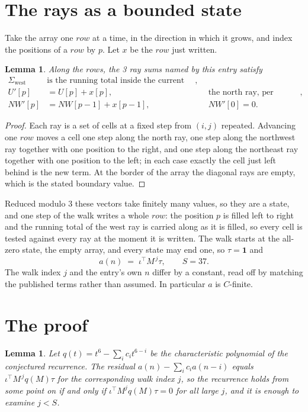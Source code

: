 \documentclass[11pt,a4paper]{article}
\theoremstyle{plain}
\newtheorem{lemma}[theorem]{Lemma}
\theoremstyle{definition}
\begin{document}
\section{The rays as a bounded state}

Take the array one $row$ at a time, in the direction in which it grows, and index the
positions of a $row $ by $p$. Let $x$ be the $row$ just written.

\begin{lemma}\label{lem:rays}
Along the $row$s, the 3 ray sums named by this entry satisfy
\[
\begin{aligned}
\Sigma_{\mathrm{west}}\ &\text{is the running total inside the current row},\\
U'[p]&=U[p]+x[p], &&\text{the north ray, per position},\\
NW'[p]&=NW[p-1]+x[p-1], && NW'[0]=0 .
\end{aligned}
\]
\end{lemma}

\begin{proof}
Each ray is a set of cells at a fixed step from $(i,j)$ repeated. Advancing one $row$
moves a cell one step along the north ray, one step along the northwest ray together with one
position to the right, and one step along the northeast ray together with one position to the
left; in each case exactly the cell just left behind is the new term. At the border of the
array the diagonal rays are empty, which is the stated boundary value.
\end{proof}

Reduced modulo $3$ these vectors take finitely many values, so they are a state, and one step
of the walk writes a whole $row$: the position $p$ is filled left to right and the
running total of the west ray is carried along as it is filled, so every cell is tested
against every ray at the moment it is written. The walk starts at the all-zero state, the empty
array, and every state may end one, so $\tau=\mathbf{1}$ and
\[
a(n)\;=\;\iota^{\!\top}M^{\,j}\tau ,\qquad S=37.
\]
The walk index $j$ and the entry's own $n$ differ by a constant, read off by matching the
published terms rather than assumed. In particular $a$ is $C$-finite.

\section{The proof}

\begin{lemma}\label{lem:crit}
Let $q(t)=t^{6}-\sum_i c_it^{6-i}$ be the characteristic polynomial of the
conjectured recurrence. The residual $a(n)-\sum_ic_ia(n-i)$ equals
$\iota^{\!\top}M^{\,j}q(M)\tau$ for the corresponding walk index $j$, so the recurrence
holds from some point on if and only if $\iota^{\!\top}M^{j}q(M)\tau=0$ for all large $j$,
and it is enough to examine $j<S$.
\end{lemma}
\end{document}
